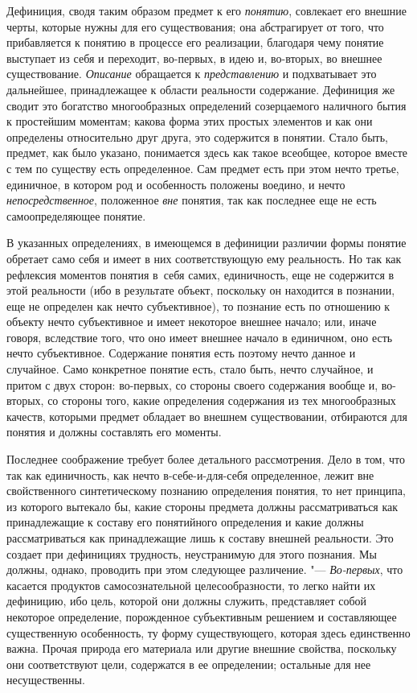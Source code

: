 Дефиниция, сводя таким образом предмет к его
{\em понятию}, совлекает
его внешние черты, которые нужны для его существования; она абстрагирует от
того, что прибавляется к понятию в процессе его реализации, благодаря чему
понятие выступает из себя и переходит, во-первых, в идею и, во-вторых, во
внешнее существование. {\em Описание}
обращается к
{\em представлению} и
подхватывает это дальнейшее, принадлежащее к области реальности содержание.
Дефиниция же сводит это богатство многообразных определений созерцаемого
наличного бытия к простейшим моментам; какова форма этих простых элементов
и как они определены относительно друг друга, это содержится в понятии.
Стало быть, предмет, как было указано, понимается здесь как такое всеобщее,
которое вместе с тем по существу есть определенное. Сам предмет есть при
этом нечто третье, единичное, в котором род и особенность
положены воедино, и нечто
{\em непосредственное},
положенное {\em вне}
понятия, так как последнее еще не есть самоопределяющее
понятие.

В указанных определениях, в имеющемся в дефиниции различии
формы понятие обретает само себя и имеет в них соответствующую ему
реальность. Но так как рефлексия моментов понятия в~себя самих,
единичность, еще не содержится в этой реальности (ибо в результате объект,
поскольку он находится в познании, еще не определен как нечто
субъективное), то познание есть по отношению к объекту нечто субъективное и
имеет некоторое внешнее начало; или, иначе говоря, вследствие того, что оно
имеет внешнее начало в единичном, оно есть нечто субъективное. Содержание
понятия есть поэтому нечто данное и случайное. Само конкретное понятие
есть, стало быть, нечто случайное, и притом с двух сторон: во-первых, со
стороны своего содержания вообще и, во-вторых, со стороны того, какие
определения содержания из тех многообразных качеств, которыми предмет
обладает во внешнем существовании, отбираются для понятия и должны
составлять его моменты.

Последнее соображение требует более детального рассмотрения.
Дело в том, что так как единичность, как нечто
в-себе-и-для-себя определенное, лежит вне свойственного
синтетическому познанию определения понятия, то нет принципа, из которого
вытекало бы, какие стороны предмета должны рассматриваться как
принадлежащие к составу его понятийного определения и какие должны
рассматриваться как принадлежащие лишь к составу внешней реальности. Это
создает при дефинициях трудность, неустранимую для этого познания. Мы
должны, однако, проводить при этом следующее различение. "---
{\em Во-первых}, что
касается продуктов самосознательной целесообразности, то легко найти их
дефиницию, ибо цель, которой они должны служить, представляет собой
некоторое определение, порожденное субъективным решением и составляющее
существенную особенность, ту форму существующего, которая здесь единственно
важна. Прочая природа его материала или другие внешние свойства, поскольку
они соответствуют цели, содержатся в ее определении; остальные для нее
несущественны.

